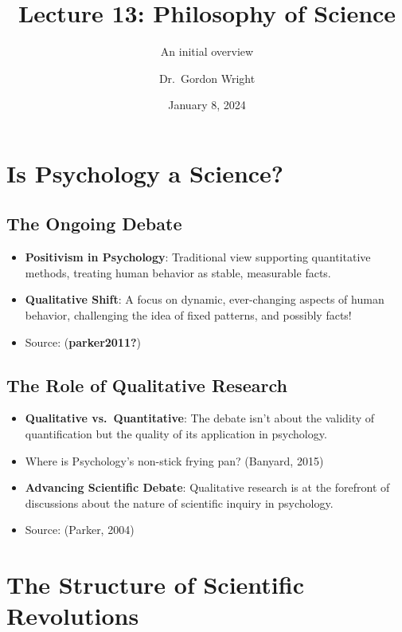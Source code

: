 \documentclass[
  letterpaper,
  DIV=11,
  numbers=noendperiod]{scrartcl}
\title{Lecture 13: Philosophy of Science}
\subtitle{An initial overview}
\author{Dr.~Gordon Wright}
\date{January 8, 2024}
\providecommand{\tightlist}{%
  \setlength{\itemsep}{0pt}\setlength{\parskip}{0pt}}\usepackage{longtable,booktabs,array}
\begin{document}
\maketitle

\raggedright

\section{Is Psychology a Science?}\label{is-psychology-a-science}

\subsection{The Ongoing Debate}\label{the-ongoing-debate}

\begin{itemize}
\tightlist
\item
  \textbf{Positivism in Psychology}: Traditional view supporting
  quantitative methods, treating human behavior as stable, measurable
  facts.
\item
  \textbf{Qualitative Shift}: A focus on dynamic, ever-changing aspects
  of human behavior, challenging the idea of fixed patterns, and
  possibly facts!
\item
  Source: (\textbf{parker2011?})
\end{itemize}

\subsection{The Role of Qualitative
Research}\label{the-role-of-qualitative-research}

\begin{itemize}
\tightlist
\item
  \textbf{Qualitative vs.~Quantitative}: The debate isn't about the
  validity of quantification but the quality of its application in
  psychology.
\item
  Where is Psychology's non-stick frying pan? (Banyard, 2015)
\item
  \textbf{Advancing Scientific Debate}: Qualitative research is at the
  forefront of discussions about the nature of scientific inquiry in
  psychology.
\item
  Source: (Parker, 2004)
\end{itemize}

\section{The Structure of Scientific
Revolutions}\label{the-structure-of-scientific-revolutions}
\end{document}
